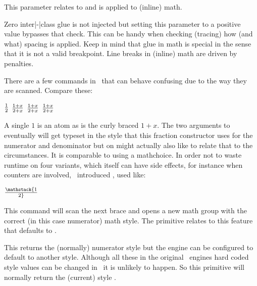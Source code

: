 \stopnewprimitive

\startnewprimitive[title={\prm {mathsnapping}}]

This parameter relates to  and is applied to (inline) math.

\stopnewprimitive

\startnewprimitive[title={\prm {mathspacingmode}}]

Zero inter|-|class glue is not injected but setting this parameter to a positive
value bypasses that check. This can be handy when checking (tracing) how (and
what) spacing is applied. Keep in mind that glue in math is special in the sense
that it is not a valid breakpoint. Line breaks in (inline) math are driven by
penalties.

\stopnewprimitive

\startnewprimitive[title={\prm {mathstack}}]

There are a few commands in \TEX\ that can behave confusing due to the way they
are scanned. Compare these:

\starttyping
$ 1 \over 2 $
$ 1 + x \over 2 + x$
$ {1 + x} \over {2 + x}$
$ {{1 + x} \over {2 + x}}$
\stoptyping

A single $1$ is an atom as is the curly braced ${1 + x}$. The two arguments to
 eventually will get typeset in the style that this fraction
constructor uses for the numerator and denominator but on might actually also
like to relate that to the circumstances. It is comparable to using a \prm
{mathchoice}. In order not to waste runtime on four variants, which itself can have
side effects, for instance when counters are involved, \LUATEX\ introduced
, used like:

\starttyping
$\mathstack {1 \over 2}$
\stoptyping

This  command will scan the next brace and opens a new math group
with the correct (in this case numerator) math style. The 
primitive relates to this feature that defaults to .

\stopnewprimitive

\startnewprimitive[title={\prm {mathstackstyle}}]

This returns the (normally) numerator style but the engine can be configured to
default to another style. Although all these in the original \TEX\ engines hard
coded style values can be changed in \LUAMETATEX\ it is unlikely to happen. So
this primitive will normally return the (current) style .


